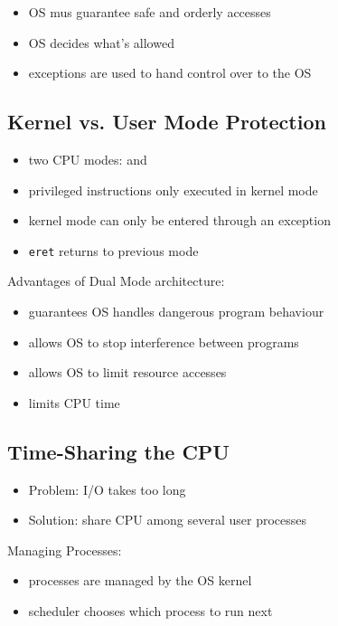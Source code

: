 \documentclass{article}
\newcommand{\T}[1]{\texttt{#1}}
\begin{document}
\begin{itemize}
	\item OS mus guarantee safe and orderly accesses
	\item OS decides what's allowed
	\item exceptions are used to hand control over to the OS
\end{itemize}

\subsection{Kernel vs. User Mode Protection}

\begin{itemize}
	\item two CPU modes:  and 
	\item privileged instructions only executed in kernel mode
	\item kernel mode can only be entered through an exception
	\item \T{eret} returns to previous mode
\end{itemize}

Advantages of Dual Mode architecture:
\begin{itemize}
	\item guarantees OS handles dangerous program behaviour
	\item allows OS to stop interference between programs
	\item allows OS to limit resource accesses
	\item limits CPU time
\end{itemize}

\subsection{Time-Sharing the CPU}

\begin{itemize}
	\item Problem: I/O takes too long
	\item Solution: share CPU among several user processes
\end{itemize}

Managing Processes:
\begin{itemize}
	\item processes are managed by the OS kernel 
	\item scheduler chooses which process to run next
\end{itemize}
\end{document}
